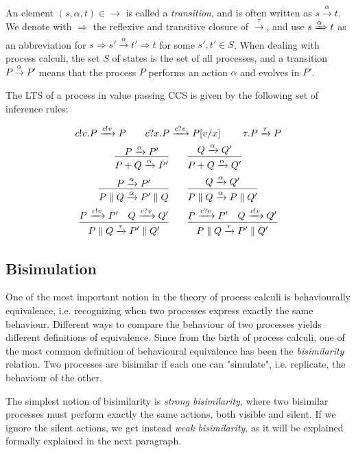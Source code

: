 An element $(s, \alpha, t) \in \rightarrow$ is called a \textit{transition}, and is often written as $s \xrightarrow{\alpha} t$. We denote with $\Rightarrow$ the reflexive and transitive closure of $\xrightarrow{\tau}$, and use $s \xRightarrow{\alpha} t$ as an abbreviation for $s \Rightarrow s' \xrightarrow{\alpha} t' \Rightarrow t$ for some $s', t' \in S$. When dealing with process calculi, the set $S$ of states is the set of all processes, and a transition $P \xrightarrow{\alpha} P'$ means that the process $P$ performs an action $\alpha$ and evolves in $P'$.

The LTS of a process in value passing CCS is given by the following set of inference rules: 

\begin{gather*}
c!v.P \xrightarrow{c!v} P \qquad c?x.P \xrightarrow{c?v} P[v/x] \qquad \	\tau.P \xrightarrow{\tau} P
\\
\infer{P + Q \xrightarrow{\alpha} P'}{P \xrightarrow{\alpha} P'} \qquad \infer{P + Q \xrightarrow{\alpha} Q'}{Q \xrightarrow{\alpha} Q'} 
\\
\infer{P \parallel Q \xrightarrow{\alpha} P'\parallel Q}{P \xrightarrow{\alpha} P'} \qquad \infer{P \parallel Q \xrightarrow{\alpha} P\parallel Q'}{Q \xrightarrow{\alpha} Q'} 
\\
\infer{P \parallel Q \xrightarrow{\tau} P'\parallel Q'}{P \xrightarrow{c!v} P' & Q \xrightarrow{c?v} Q' } \qquad
\infer{P \parallel Q \xrightarrow{\tau} P'\parallel Q'}{P \xrightarrow{c?v} P' & Q \xrightarrow{c!v} Q' } 
\\
\end{gather*}

\subsection{Bisimulation}

One of the most important notion in the theory of process calculi is behaviourally equivalence, i.e. recognizing when two processes express exactly the same behaviour. Different ways to compare the behaviour of two processes yields different definitions of equivalence. Since from the birth of process calculi, one of the most common definition of behavioural equivalence has been the \textit{bisimilarity} relation. Two processes are bisimilar if each one can "simulate", i.e. replicate, the behaviour of the other. 

The simplest notion of bisimilarity is \textit{strong bisimilarity}, where two bisimilar processes must perform exactly the same actions, both visible and silent. If we ignore the silent actions, we get instead \textit{weak bisimilarity}, as it will be explained formally   explained in the next paragraph.


